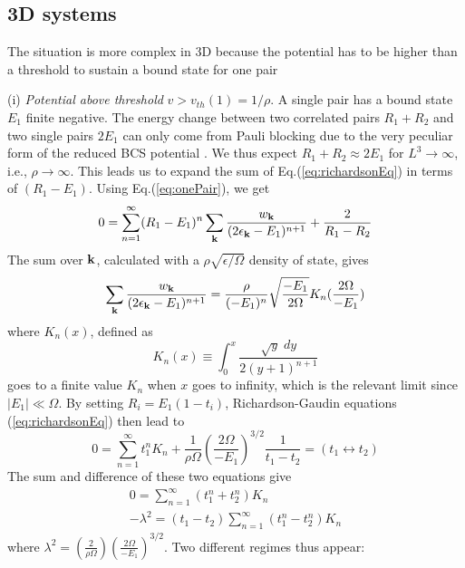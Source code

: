 \documentclass[5p,twocolumn]{elsarticle}
\begin{document}
\subsection{3D systems}

The situation is more complex in 3D because the potential has to be higher than a threshold to sustain a bound state for one pair

(i) {\it Potential above threshold} $v>v_{th}(1)=1/\rho$. A single pair  has a bound state  $E_1$  finite negative. The energy change between two correlated pairs $R_{1}+R_{2}$ and two single pairs  $2E_{1}$ can only come from Pauli blocking due to the very peculiar form of the reduced BCS potential \cite{moth}. We thus expect $R_1+R_2\approx2E_1$ for $L^3\rightarrow\infty$, i.e., $\rho\rightarrow\infty$. This leads us to expand the sum of Eq.(\ref{eq:richardsonEq}) in terms of $(R_{1}-E_{1})$.  Using Eq.(\ref{eq:onePair}), we get
\begin{equation}
0=\sum_{n=1}^{\infty}(R_{1}-E_{1})^{n}\sum_{\mathbf{k}}\frac{w_{\mathbf{k}}}{(2\epsilon_{\mathbf{k}}-E_1)^{n+1}}+\frac{2}{R_1-R_2}
\end{equation}
The sum over $\mathbf{k}$, calculated with a $\rho\sqrt{\epsilon/\Omega}$ density of state, gives
\begin{equation}
\sum_{\mathbf{k}}\frac{w_{\mathbf{k}}}{(2\epsilon_{\mathbf{k}}-E_1)^{n+1}}=\\\frac{\rho}{(-E_{1})^{n}}\sqrt{\frac{-E_{1}}{2\Omega}}K_{n}(\frac{2\Omega}{-E_{1}})
\end{equation}
where $K_{n}(x)$, defined as
\begin{equation}
K_{n}(x)\equiv\int_{0}^{x}\frac{\sqrt{y}\;dy}{2(y+1)^{n+1}}
\end{equation}
goes to a finite value $K_{n}$ when $x$ goes to infinity, which is the relevant limit since $|E_1|\ll\Omega$.
By setting
$R_{i}=E_{1}(1-t_{i})$, Richardson-Gaudin equations (\ref{eq:richardsonEq})  then lead to
\begin{equation}
0=\sum_{n=1}^{\infty}t_{1}^{n}K_{n}+\frac{1}{\rho\Omega}\left(\frac{2\Omega}{-E_{1}}\right)^{3/2}\frac{1}{t_1-t_2}=(t_{1}\leftrightarrow{}t_{2})
\end{equation}
The sum and difference of these two equations give
\begin{gather}
0=\sum_{n=1}^{\infty}(t_{1}^{n}+t_{2}^{n})K_{n}\label{eq:t2}\\
-\lambda^{2}=(t_{1}-t_{2})\sum_{n=1}^{\infty}(t_{1}^{n}-t_{2}^{n})K_{n}\label{eq:t1}
\end{gather}
where $\lambda^2=(\frac{2}{\rho\Omega})(\frac{2\Omega}{-E_{1}})^{3/2}$.
Two different regimes thus appear: 
\end{document}
